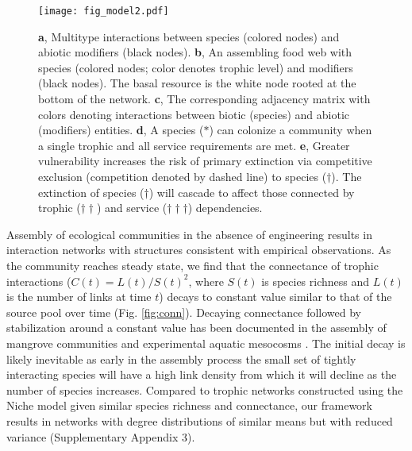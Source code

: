 \documentclass[twocolumn,preprintnumbers,amsmath,amssymb,superscriptaddress,linenumbers]{revtex4-1}
\begin{document}
\begin{figure}[h!]
\centering
\texttt{[image: fig\_model2.pdf]}
\vspace{0mm}
\caption{
\textbf{a}, Multitype interactions between species (colored nodes) and abiotic modifiers (black nodes).
\textbf{b}, An assembling food web with species (colored nodes; color denotes trophic level) and modifiers (black nodes). The basal resource is the white node rooted at the bottom of the network.
\textbf{c}, The corresponding adjacency matrix with colors denoting interactions between biotic (species) and abiotic (modifiers) entities.
\textbf{d}, A species ($\ast$) can colonize a community when a single trophic and all service requirements are met.
\textbf{e}, Greater vulnerability increases the risk of primary extinction via competitive exclusion (competition denoted by dashed line) to species ($\dag$).
The extinction of species ($\dag$) will cascade to affect those connected by trophic ($\dag \dag$) and service ($\dag \dag \dag$) dependencies. 
\vspace{-3mm}
}
\vspace{0mm}
\label{fig:model}
\end{figure}

Assembly of ecological communities in the absence of engineering results in interaction networks with structures consistent with empirical observations.
As the community reaches steady state, we find that the connectance of trophic interactions ($C(t)=L(t)/S(t)^2$, where $S(t)$ is species richness and $L(t)$ is the number of links at time $t$) decays to constant value similar to that of the source pool over time (Fig. \ref{fig:conn}).
Decaying connectance followed by stabilization around a constant value has been documented in the assembly of mangrove communities \cite{Piechnik2008} and experimental aquatic mesocosms \cite{Fahimipour2014}. 
The initial decay is likely inevitable as early in the assembly process the small set of tightly interacting species will have a high link density from which it will decline as the number of species increases.
Compared to trophic networks constructed using the Niche model \cite{Williams2000} given similar species richness and connectance, our framework results in networks with degree distributions of similar means but with reduced variance (Supplementary Appendix 3).
\end{document}
